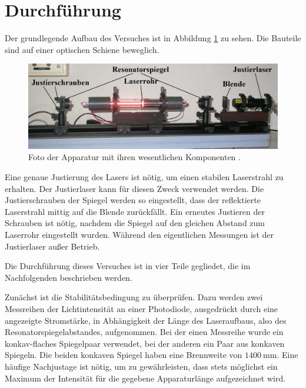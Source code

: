 \section{Durchführung}
\label{sec:Durchführung}

Der grundlegende Aufbau des Versuches ist in Abbildung \ref{fig:aufbau} zu sehen. Die Bauteile sind auf einer optischen Schiene beweglich.

\begin{figure}
  \centering
  \includegraphics[width=\textwidth]{data/aufbau.png}
  \caption{Foto der Apparatur mit ihren wesentlichen Komponenten \cite{Anleitung_neu}.}
  \label{fig:aufbau}
\end{figure}

Eine genaue Justierung des Lasers ist nötig, um einen stabilen Laserstrahl zu erhalten. Der Justierlaser kann für diesen Zweck verwendet werden. Die Justierschrauben der Spiegel werden so eingestellt, dass der reflektierte Laserstrahl mittig auf die Blende zurückfällt. Ein erneutes Justieren der Schrauben ist nötig, nachdem die Spiegel auf den gleichen Abstand zum Laserrohr eingestellt wurden. Während den eigentlichen Messungen ist der Justierlaser außer Betrieb.

Die Durchführung dieses Versuches ist in vier Teile gegliedet, die im Nachfolgenden beschrieben werden.

Zunächst ist die Stabilitätsbedingung zu überprüfen. Dazu werden zwei Messreihen der Lichtintensität an einer Photodiode, ausgedrückt durch eine angezeigte Stromstärke, in Abhängigkeit der Länge des Laseraufbaus, also des Resonatorspiegelabstandes, aufgenommen. Bei der einen Messreihe wurde ein konkav-flaches Spiegelpaar verwendet, bei der anderen ein Paar aus konkaven Spiegeln. Die beiden konkaven Spiegel haben eine Brennweite von $\SI{1400}{\milli\meter}$. Eine häufige Nachjustage ist nötig, um zu gewährleisten, dass stets möglichst ein Maximum der Intensität für die gegebene Apparaturlänge aufgezeichnet wird.

